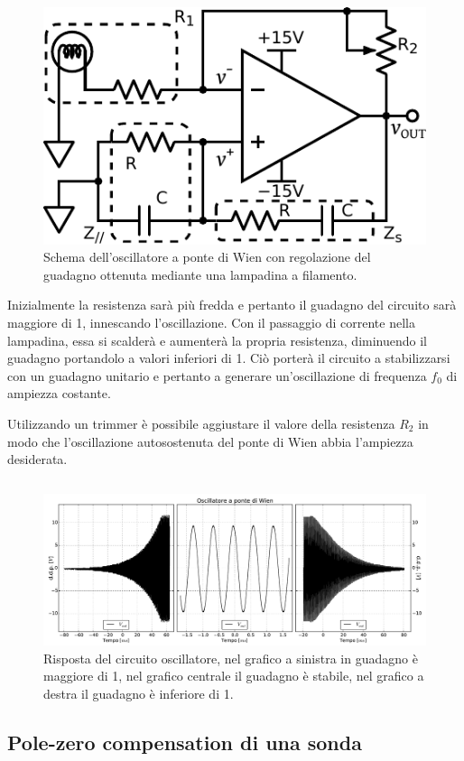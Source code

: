 \begin{figure}
\centering
\includegraphics[width=.35\textwidth]{../E08/latex/osc_w_lamp.pdf}
\caption{Schema dell'oscillatore a ponte di Wien con regolazione del guadagno ottenuta mediante una lampadina a filamento.}
\label{cir8:with_lamp}
\end{figure}

Inizialmente la resistenza sarà più fredda e pertanto il guadagno del circuito sarà maggiore di \num{1}, innescando l'oscillazione.
Con il passaggio di corrente nella lampadina, essa si scalderà e aumenterà la propria resistenza, diminuendo il guadagno portandolo a valori inferiori di \num{1}.
Ciò porterà il circuito a stabilizzarsi con un guadagno unitario e pertanto a generare un'oscillazione di frequenza $f_0$ di ampiezza costante.

Utilizzando un trimmer è possibile aggiustare il valore della resistenza $R_2$ in modo che l'oscillazione autosostenuta del ponte di Wien abbia l'ampiezza desiderata.

$$$$
$$$$

\begin{figure}[htpc]
\centering
\includegraphics[width=.95\textwidth]{../E08/latex/wien.pdf}
\caption{Risposta del circuito oscillatore, nel grafico a sinistra in guadagno è maggiore di \num{1}, nel grafico centrale il guadagno è stabile, nel grafico a destra il guadagno è inferiore di \num{1}.}
\label{fig8:wien}
\end{figure}

\subsection{Pole-zero compensation di una sonda}

